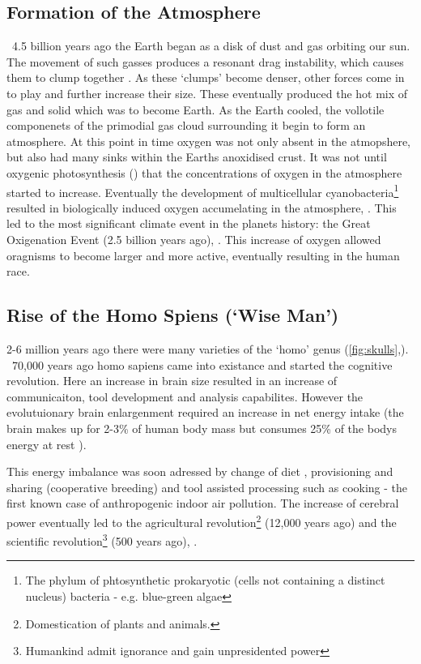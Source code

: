 \subsection{Formation of the Atmosphere}
 ~4.5 billion years ago the Earth began as a disk of dust and gas orbiting our sun. The movement of such gasses produces a resonant drag instability, which causes them to clump together \citep{drag,planet}. As these `clumps' become denser, other forces come in to play and further increase their size. These eventually produced the hot mix of gas and solid which was to become Earth.
 As the Earth cooled, the vollotile componenets of the primodial gas cloud surrounding it begin to form an atmosphere. %
At this point in time oxygen was not only absent in the atmopshere, but also had many sinks within the Earths anoxidised crust. It was not until oxygenic photosynthesis (\citep{oxygenicphotosynthesis}) that the concentrations of oxygen in the atmosphere started to increase. Eventually the development of multicellular cyanobacteria\footnote{The phylum of phtosynthetic prokaryotic (cells not containing a distinct nucleus) bacteria - e.g. blue-green algae} resulted in biologically induced oxygen accumelating in the atmosphere, \citep{multicellular}. This led to the most significant climate event in the planets history: the Great Oxigenation Event (2.5 billion years ago), \citep{oxidation}. This increase of oxygen allowed oragnisms to become larger and more active, eventually resulting in the human race.


\subsection{Rise of the Homo Spiens (`Wise Man')}
2-6 million years ago there were many varieties of the `homo' genus (\autoref{fig:skulls},\cite{skulls}). ~70,000 years ago homo sapiens  came into existance and started the cognitive revolution. Here an increase in brain size resulted in an increase of communicaiton, tool development and analysis capabilites. However the evolutuionary brain enlargenment required an increase in net energy intake \citep{brainenergy} (the brain makes up for 2-3\% of human body mass but consumes 25\% of the bodys energy at rest \citep{sapiens}).

This energy imbalance was soon adressed by change of diet \citep{diet}, provisioning and sharing (cooperative breeding) and tool assisted processing such as cooking \citep{cooking} - the first known case of anthropogenic indoor air pollution. The increase of cerebral power eventually led to the agricultural revolution\footnote{Domestication of plants and animals.} (12,000 years ago) and the scientific revolution\footnote{Humankind admit ignorance and gain unpresidented power} (500 years ago), \citep{sapiens}.



